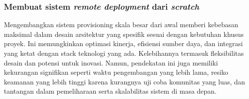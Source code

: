 \subsubsection{Membuat sistem \textit{remote deployment} dari \textit{scratch}}
Mengembangkan sistem provisioning skala besar dari awal memberi kebebasan maksimal dalam desain arsitektur yang spesifik sesuai dengan kebutuhan khusus proyek. Ini memungkinkan optimasi kinerja, efisiensi sumber daya, dan integrasi yang ketat dengan stack teknologi yang ada. Kelebihannya termasuk fleksibilitas desain dan potensi untuk inovasi. Namun, pendekatan ini juga memiliki kekurangan signifikan seperti waktu pengembangan yang lebih lama, resiko keamanan yang lebih tinggi karena kurangnya uji coba komunitas yang luas, dan tantangan dalam pemeliharaan serta skalabilitas sistem di masa depan.